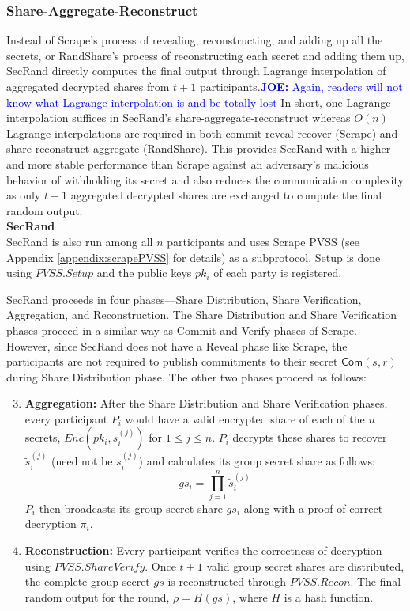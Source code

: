 \documentclass[letterpaper,twocolumn,10pt]{article}
\theoremstyle{definition}
\theoremstyle{remark}
\newcommand{\joenote}[1]{\textcolor{blue}{\textbf{JOE:} #1}}
\begin{document}
\subsubsection{Share-Aggregate-Reconstruct}
Instead of Scrape's process of revealing, reconstructing, and adding up all the secrets, or RandShare's process of reconstructing each secret and adding them up, SecRand directly computes the final output through Lagrange interpolation of aggregated decrypted shares from $t + 1$ participants.\joenote{Again, readers will not know what Lagrange interpolation is and be totally lost} In short, one Lagrange interpolation suffices in SecRand's share-aggregate-reconstruct whereas $O(n)$ Lagrange interpolations are required in both commit-reveal-recover (Scrape) and share-reconstruct-aggregate (RandShare). This provides SecRand with a higher and more stable performance than Scrape against an adversary's malicious behavior of withholding its secret and also reduces the communication complexity as only $t + 1$ aggregated decrypted shares are exchanged to compute the final random output.\\

\textbf{SecRand}\\

SecRand is also run among all $n$ participants and uses Scrape PVSS (see Appendix \ref{appendix:scrapePVSS} for details) as a subprotocol. Setup is done using $PVSS.Setup$ and the public keys $pk_i$ of each party is registered. 

SecRand proceeds in four phases---Share Distribution, Share Verification, Aggregation, and Reconstruction. The Share Distribution and Share Verification phases proceed in a similar way as Commit and Verify phases of Scrape. However, since SecRand does not have a Reveal phase like Scrape, the participants are not required to publish commitments to their secret $\mathsf{Com}(s, r)$ during Share Distribution phase. The other two phases proceed as follows:
\begin{enumerate}
    \setcounter{enumi}{2}
    \item \textbf{Aggregation:} After the Share Distribution and Share Verification phases, every participant $P_i$ would have a valid encrypted share of each of the $n$ secrets, $Enc(pk_i, s_i^{(j)})$ for $1 \le j \le n$. $P_i$ decrypts these shares to recover $\tilde{s}_i^{(j)}$ (need not be $s_i^{(j)}$) and calculates its group secret share as follows: 
    $$ gs_i = \prod_{j=1}^{n}\tilde{s}_i^{(j)} $$
    $P_i$ then broadcasts its group secret share $gs_i$ along with a proof of correct decryption $\pi_i$.
    \item \textbf{Reconstruction:} Every participant verifies the correctness of decryption using $PVSS.ShareVerify$. Once $t+1$ valid group secret shares are distributed, the complete group secret $gs$ is reconstructed through $PVSS.Recon$. The final random output for the round, $\rho = H(gs)$, where $H$ is a hash function.
\end{enumerate}
\end{document}

